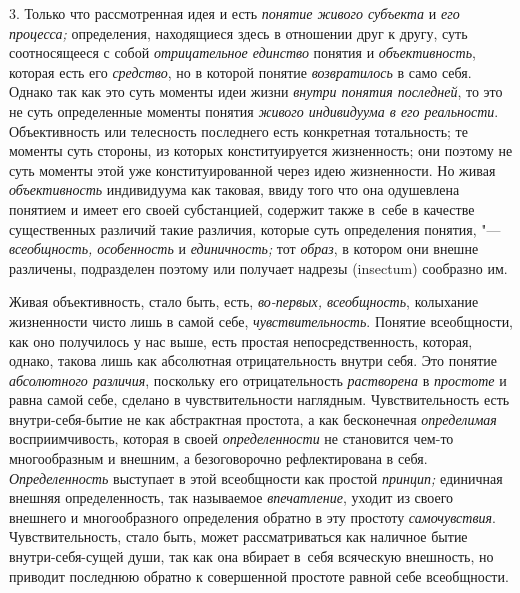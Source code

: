 3. Только что рассмотренная идея и есть {\em понятие живого субъекта}
и {\em его процесса;} определения, находящиеся здесь в отношении друг к другу,
суть соотносящееся с собой {\em отрицательное единство} понятия и
{\em объективность}, которая есть его {\em средство}, но в которой понятие
{\em возвратилось} в само себя. Однако так как это суть моменты идеи жизни
{\em внутри понятия последней}, то это не суть определенные моменты понятия
{\em живого индивидуума в его реальности}.
Объективность или телесность последнего есть
конкретная тотальность; те моменты суть стороны, из которых конституируется
жизненность; они поэтому не суть моменты этой уже конституированной через
идею жизненности. Но живая {\em объективность}
индивидуума как таковая, ввиду того что она одушевлена
понятием и имеет его своей субстанцией, содержит также в~себе в качестве
существенных различий такие различия, которые суть определения понятия, "---
{\em всеобщность, особенность} и {\em единичность;} тот {\em образ},
в котором они внешне различены, подразделен поэтому или
получает надрезы (insectum) сообразно
им.

Живая объективность, стало быть, есть, {\em во-первых, всеобщность},
колыхание жизненности чисто лишь в самой себе, {\em чувствительность}.
Понятие всеобщности, как оно получилось у нас выше, есть
простая непосредственность, которая, однако, такова лишь как абсолютная
отрицательность внутри себя. Это понятие {\em абсолютного различия},
поскольку его отрицательность {\em растворена} в {\em простоте} и равна
самой себе, сделано в чувствительности наглядным. Чувствительность есть
внутри-себя-бытие не как абстрактная простота, а как бесконечная
{\em определимая} восприимчивость, которая в своей {\em определенности} не
становится чем-то многообразным и внешним, а безоговорочно рефлектирована в
себя. {\em Определенность} выступает в этой всеобщности как простой
{\em принцип;} единичная внешняя определенность, так называемое
{\em впечатление}, уходит из своего внешнего и многообразного определения
обратно в эту простоту {\em самочувствия}.
Чувствительность, стало быть, может рассматриваться как
наличное бытие внутри-себя-сущей души, так как она вбирает в~себя всяческую
внешность, но приводит последнюю обратно к совершенной простоте равной себе
всеобщности.

